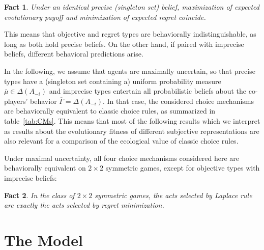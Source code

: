 \documentclass[fleqn,reqno,12pt]{article}
\theoremstyle{Satz}
\newtheorem{fact}{Fact}
\theoremstyle{Bsp}
\newcommand{\Acts}{\ensuremath{A}\xspace}		%
\begin{document}
\iffalse
\begin{fact} \label{fact:singleton probability set}
Maximinimization under a precise (singleton set) belief is just standard
maximization of expected utility (Definition~\ref{def:rationality}).
\end{fact}
\fi

\begin{fact} \label{fact:maxEU-minReg} 
Under an identical precise (singleton set) belief, maximization of expected evolutionary payoff and minimization of expected regret coincide. %
\end{fact}

\noindent This means that objective and regret types are behaviorally indistinguishable, as long as both hold precise beliefs. 
On the other hand, if paired with imprecise beliefs, different behavioral predictions
arise.

In the following, we assume that agents are maximally uncertain, so that precise types have a
(singleton set containing a) uniform probability measure
$\overline{\mu} \in \Delta(\Acts_{-i})$ and imprecise types entertain all probabilistic beliefs
about the co-players' behavior $\overline{\Gamma} = \Delta(\Acts_{-i})$. In that case, the
considered choice mechanisms are behaviorally equivalent to classic choice rules, as summarized
in table~\ref{tab:CMs}. This means that most of the following results which we interpret as results about the evolutionary fitness of different subjective representations are also relevant for a comparison of the ecological value of classic choice
rules.

Under maximal uncertainty, all four choice mechanisms considered here are behaviorally
equivalent on $2 \times 2$ symmetric games, except for objective types with
imprecise beliefs:

\begin{fact} \label{fact:equivalence2x2} In the class of $2 \times 2$ symmetric games, the acts
  selected by Laplace rule are exactly the acts selected by regret minimization.
\end{fact} 


\section{The Model}
\label{sec:basic-model-1}
\end{document}

